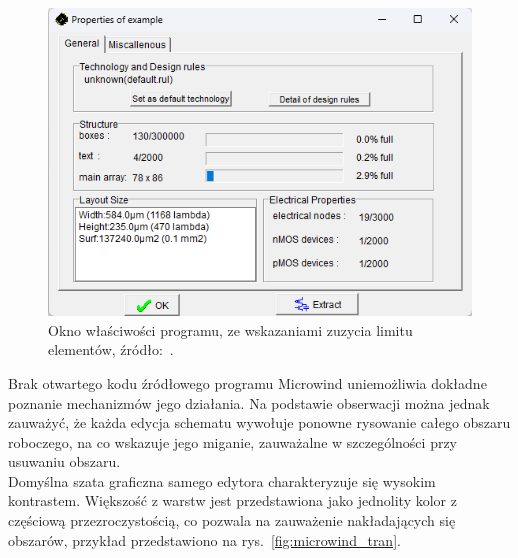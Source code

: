 \begin{figure}[h]
    \centering
    \includegraphics[width=.9\textwidth]{chapters/chapter2/img/microwind_opcje}
    \caption[Okno właściwości programu, ze wskazaniami zuzycia limitu elementów.]
    {
        Okno właściwości programu, ze wskazaniami zuzycia limitu elementów,
        źródło:~\cite{Microwind}.
    }
    \label{fig:microwind_limit}
\end{figure}

Brak otwartego kodu źródłowego programu Microwind uniemożliwia dokładne poznanie mechanizmów jego działania.
Na podstawie obserwacji można jednak zauważyć,\linebreak
że każda edycja schematu wywołuje ponowne rysowanie całego obszaru roboczego,
na co wskazuje jego miganie, zauważalne w szczególności przy usuwaniu obszaru.\\
\indent Domyślna szata graficzna samego edytora charakteryzuje się wysokim kontrastem.
Większość z warstw jest przedstawiona jako jednolity kolor z częściową przezroczystością,
co pozwala na zauważenie nakładających się obszarów, przykład przedstawiono na rys.~\ref{fig:microwind_tran}.


